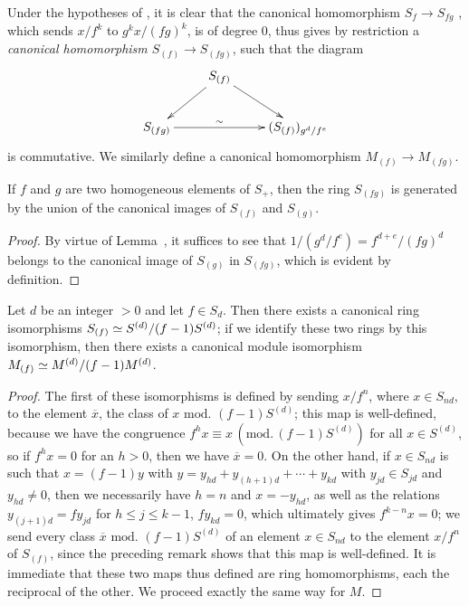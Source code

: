\begin{env}[2.2.3]
\label{II.2.2.3}
Under the hypotheses of , it is clear that the canonical homomorphism $S_f\to S_{fg}$ , which sends $x/f^k$ to $g^k x/(fg)^k$, is of degree $0$, thus gives by restriction a \emph{canonical homomorphism $S_{(f)}\to S_{(fg)}$}, such that the diagram
\[
  \xymatrix{
    & S_{(f)}\ar[dl]\ar[dr]\\
    S_{(fg)}\ar[rr]^-{\sim} & &
    (S_{(f)})_{g^d/f^e}
  }
\]
is commutative.
We similarly define a canonical homomorphism $M_{(f)}\to M_{(fg)}$.
\end{env}

\begin{lemma}[2.2.4]
\label{II.2.2.4}
If $f$ and $g$ are two homogeneous elements of $S_+$, then the ring $S_{(fg)}$ is generated by the union of the canonical images of $S_{(f)}$ and $S_{(g)}$.
\end{lemma}

\begin{proof}
By virtue of Lemma~, it suffices to see that $1/(g^d/f^e)=f^{d+e}/(fg)^d$ belongs to the canonical image of $S_{(g)}$ in $S_{(fg)}$, which is evident by definition.
\end{proof}

\begin{proposition}[2.2.5]
\label{II.2.2.5}
Let $d$ be an integer $>0$ and let $f\in S_d$.
Then there exists a canonical ring isomorphisms $S_{(f)}\simeq S^{(d)}/(f-1)S^{(d)}$;
if we identify these two rings by this isomorphism, then there exists a canonical module isomorphism $M_{(f)}\simeq M^{(d)}/(f-1)M^{(d)}$.
\end{proposition}

\begin{proof}
The first of these isomorphisms is defined by sending $x/f^n$, where $x\in S_{nd}$, to the element $\overline{x}$, the class of $x\text{ mod. }(f-1)S^{(d)}$;
this map is well-defined, because we have the congruence $f^h x\equiv x\,(\text{mod.}\,(f-1)S^{(d)})$ for all $x\in S^{(d)}$, so if $f^h x=0$ for an $h>0$,
then we have $\overline{x}=0$.
On the other hand, if $x\in S_{nd}$ is such that $x=(f-1)y$ with $y=y_{hd}+y_{(h+1)d}+\cdots+y_{kd}$ with $y_{jd}\in S_{jd}$ and $y_{hd}\neq 0$, then we necessarily have $h=n$ and $x=-y_{hd}$, as well as the relations $y_{(j+1)d}=fy_{jd}$ for $h\leq j\leq k-1$, $fy_{kd}=0$, which ultimately gives $f^{k-n}x=0$;
we send every class $\overline{x}\text{ mod. }(f-1)S^{(d)}$ of an element $x\in S_{nd}$ to the element $x/f^n$ of $S_{(f)}$, since the preceding remark shows that this map is well-defined.
It is immediate that these two maps thus defined are ring homomorphisms, each the reciprocal of the other.
We proceed exactly the same way for $M$.
\end{proof}

